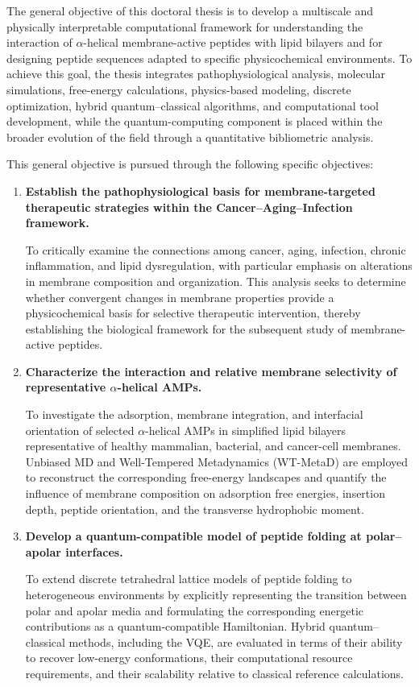 The general objective of this doctoral thesis is to develop a multiscale and physically interpretable computational framework for understanding the interaction of $\alpha$-helical membrane-active peptides with lipid bilayers and for designing peptide sequences adapted to specific physicochemical environments. To achieve this goal, the thesis integrates pathophysiological analysis, molecular simulations, free-energy calculations, physics-based modeling, discrete optimization, hybrid quantum--classical algorithms, and computational tool development, while the quantum-computing component is placed within the broader evolution of the field through a quantitative bibliometric analysis.

This general objective is pursued through the following specific objectives:

\begin{enumerate}

\item \textbf{Establish the pathophysiological basis for membrane-targeted therapeutic strategies within the Cancer--Aging--Infection framework.}

To critically examine the connections among cancer, aging, infection, chronic inflammation, and lipid dysregulation, with particular emphasis on alterations in membrane composition and organization. This analysis seeks to determine whether convergent changes in membrane properties provide a physicochemical basis for selective therapeutic intervention, thereby establishing the biological framework for the subsequent study of membrane-active peptides.

\item \textbf{Characterize the interaction and relative membrane selectivity of representative $\alpha$-helical AMPs.}

To investigate the adsorption, membrane integration, and interfacial orientation of selected $\alpha$-helical AMPs in simplified lipid bilayers representative of healthy mammalian, bacterial, and cancer-cell membranes. Unbiased MD and Well-Tempered Metadynamics (WT-MetaD) are employed to reconstruct the corresponding free-energy landscapes and quantify the influence of membrane composition on adsorption free energies, insertion depth, peptide orientation, and the transverse hydrophobic moment.

\item \textbf{Develop a quantum-compatible model of peptide folding at polar--apolar interfaces.}

To extend discrete tetrahedral lattice models of peptide folding to heterogeneous environments by explicitly representing the transition between polar and apolar media and formulating the corresponding energetic contributions as a quantum-compatible Hamiltonian. Hybrid quantum--classical methods, including the VQE, are evaluated in terms of their ability to recover low-energy conformations, their computational resource requirements, and their scalability relative to classical reference calculations.


\end{enumerate}
